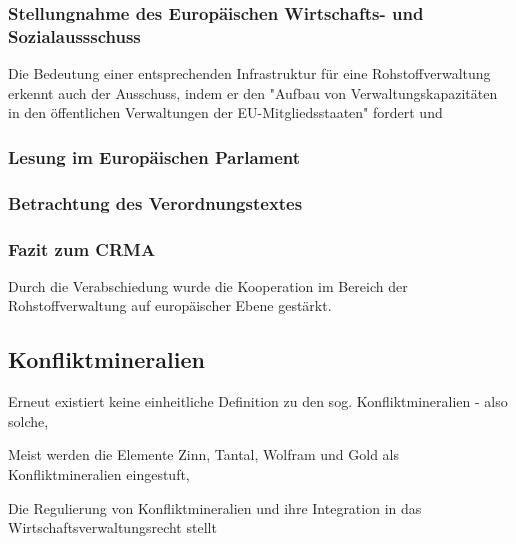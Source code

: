 \documentclass[12pt,a4paper,oneside]{book} %
\begin{document}
{	\subsubsection{Stellungnahme des Europäischen Wirtschafts- und Sozialaussschuss}
	
	Die Bedeutung einer entsprechenden Infrastruktur für eine Rohstoffverwaltung erkennt auch der Ausschuss, indem er den "Aufbau von Verwaltungskapazitäten in den öffentlichen Verwaltungen der EU-Mitgliedsstaaten" fordert %
	und 
	
	\subsubsection{Lesung im Europäischen Parlament}
	
	
	\subsubsection{Betrachtung des Verordnungstextes}
	
	\subsubsection{Fazit zum CRMA}
	Durch die Verabschiedung wurde die Kooperation im Bereich der Rohstoffverwaltung auf europäischer Ebene gestärkt.
	
	\subsection{Konfliktmineralien}
	Erneut existiert keine einheitliche Definition zu den sog. Konfliktmineralien - also solche, 
	
	Meist werden die Elemente Zinn, Tantal, Wolfram und Gold als Konfliktmineralien eingestuft, 
	
	Die Regulierung von Konfliktmineralien und ihre Integration in das Wirtschaftsverwaltungsrecht stellt 
	
}
\end{document}
